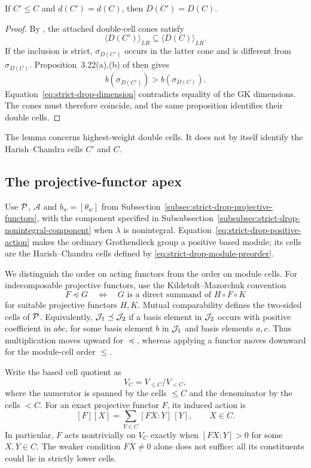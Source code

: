 \begin{lem}\label{lem:strict-drop-same-double-cell}
If $C'\leq C$ and $d(C')=d(C)$, then $D(C')=D(C)$.
\end{lem}

\begin{proof}
By \cite[Lem.~4.8]{BMSZ22}, the attached double-cell cones satisfy
\[
  \langle D(C')\rangle_{LR}\subseteq\langle D(C)\rangle_{LR}.
\]
If the inclusion is strict, $\sigma_{D(C')}$ occurs in the latter cone and
is different from $\sigma_{D(C)}$. Proposition~3.22(a),(b) of
\cite{BMSZ22} then gives
\[
  b(\sigma_{D(C')})>b(\sigma_{D(C)}).
\]
Equation~\eqref{eq:strict-drop-dimension} contradicts equality of the GK
dimensions. The cones must therefore coincide, and the same proposition
identifies their double cells.
\end{proof}

The lemma concerns highest-weight double cells. It does not by itself
identify the Harish--Chandra cells $C'$ and $C$.

\subsection{The projective-functor apex}

Use $\mathcal{P}$, $\mathcal A$ and $b_w=[\theta_w]$ from
Subsection~\ref{subsec:strict-drop-projective-functors}, with the component
specified in
Subsubsection~\ref{subsubsec:strict-drop-nonintegral-component} when
$\lambda$ is nonintegral. Equation~\eqref{eq:strict-drop-positive-action}
makes the ordinary Grothendieck group a positive based module; its cells
are the Harish--Chandra cells defined by
\eqref{eq:strict-drop-module-preorder}.

We distinguish the order on acting functors from the order on module cells.
For indecomposable projective functors, use the Kildetoft--Mazorchuk
convention
\[
  F\preceq G
  \quad\Longleftrightarrow\quad
  G\text{ is a direct summand of }H\circ F\circ K
\]
for suitable projective functors $H,K$. Mutual comparability defines the
two-sided cells of $\mathcal{P}$. Equivalently, $\mathcal{J}_1\preceq\mathcal{J}_2$ if a basis
element in $\mathcal{J}_2$ occurs with positive coefficient in $a b c$, for some
basis element $b$ in $\mathcal{J}_1$ and basis elements $a,c$. Thus multiplication
moves upward for $\preceq$, whereas applying a functor moves downward for
the module-cell order $\leq$.

Write the based cell quotient as
\[
  V_C=V_{\leq C}/V_{<C},
\]
where the numerator is spanned by the cells $\leq C$ and the denominator
by the cells $<C$. For an exact projective functor $F$, its induced action
is
\begin{equation}\label{eq:strict-drop-cell-action}
  [F][X]=\sum_{Y\in C}[FX:Y]\,[Y],\qquad X\in C.
\end{equation}
In particular, $F$ acts nontrivially on $V_C$ exactly when
$[FX:Y]>0$ for some $X,Y\in C$. The weaker condition $FX\neq0$ alone
does not suffice: all its constituents could lie in strictly lower cells.

